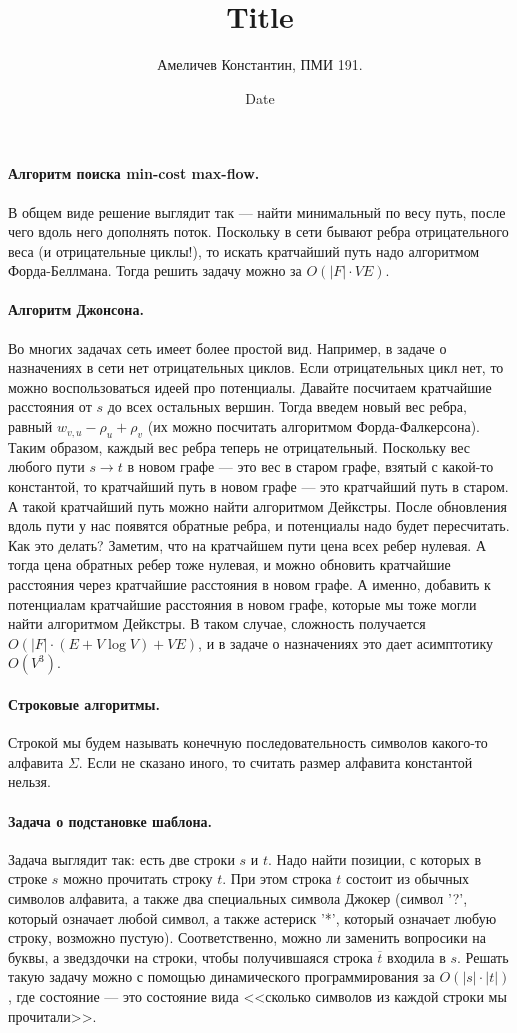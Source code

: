 \documentclass[12pt]{article}
\title{Title}
\author{Амеличев Константин, ПМИ 191.}
\date{Date}
\begin{document}
\paragraph{Алгоритм поиска min-cost max-flow.} В общем виде решение выглядит так --- найти минимальный по весу путь, после чего вдоль него дополнять поток. Поскольку в сети бывают ребра отрицательного веса (и отрицательные циклы!), то искать кратчайший путь надо алгоритмом Форда-Беллмана. Тогда решить задачу можно за $O(|F| \cdot VE)$.

\paragraph{Алгоритм Джонсона.} Во многих задачах сеть имеет более простой вид. Например, в задаче о назначениях в сети нет  отрицательных циклов. Если отрицательных цикл нет, то можно воспользоваться идеей про потенциалы. Давайте посчитаем кратчайшие расстояния от $s$ до всех остальных вершин. Тогда введем новый вес ребра, равный $w_{v, u} - \rho_u + \rho_v$ (их можно посчитать алгоритмом Форда-Фалкерсона). Таким образом, каждый вес ребра теперь не отрицательный. Поскольку вес любого пути $s \rightarrow t$ в новом графе --- это вес в старом графе, взятый с какой-то константой, то кратчайший путь в новом графе --- это кратчайший путь в старом. А такой кратчайший путь можно найти алгоритмом Дейкстры. После обновления вдоль пути у нас появятся обратные ребра, и потенциалы надо будет пересчитать. Как это делать? Заметим, что на кратчайшем пути цена всех ребер нулевая. А тогда цена обратных ребер тоже нулевая, и можно обновить кратчайшие расстояния через кратчайшие расстояния в новом графе. А именно, добавить к потенциалам кратчайшие расстояния в новом графе, которые мы тоже могли найти алгоритмом Дейкстры. В таком случае, сложность получается $O(|F| \cdot (E + V \log V) + VE)$, и в задаче о назначениях это дает асимптотику $O(V^3)$.


\paragraph{Строковые алгоритмы.} Строкой мы будем называть конечную последовательность символов какого-то алфавита $\Sigma$. Если не сказано иного, то считать размер алфавита константой нельзя.

\paragraph{Задача о подстановке шаблона.} Задача выглядит так: есть две строки $s$ и $t$. Надо найти позиции, с которых в строке $s$ можно прочитать строку $t$. При этом строка $t$ состоит из обычных символов алфавита, а также два специальных символа Джокер (символ '?', который означает любой символ, а также астериск '*', который означает любую строку, возможно пустую). Соответственно, можно ли заменить вопросики на буквы, а зведздочки на строки, чтобы получившаяся строка $\overline t$ входила в $s$. Решать такую задачу можно с помощью динамического программирования за $O(|s| \cdot |t|)$, где состояние --- это состояние вида <<сколько символов из каждой строки мы прочитали>>.
\end{document}
